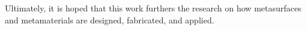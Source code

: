 Ultimately, it is hoped that this work furthers the research on how metasurfaces and metamaterials are designed, fabricated, and applied.


